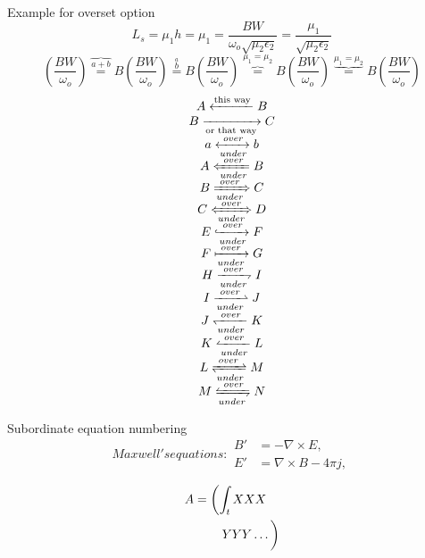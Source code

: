 \documentclass{book}
\begin{document}
Example for overset option
\begin{equation}
	L_s=\mu_1h=\mu_1=\frac{BW}{\omega_o\sqrt{\mu_2\epsilon_2}}=\frac{\mu_1}{\sqrt{\mu_2\epsilon_2}}
\end{equation}
\begin{equation}
	\left(\frac{BW}{\omega_o}\right)
	\overset{\overbrace{a+b}}{=} B
	\left(\frac{BW}{\omega_o}\right)
	\overset{\overset{a}{b}}{=} B
	\left(\frac{BW}{\omega_o}\right)
	\overset{\mu_1=\mu_2}{\overbrace{=}} B
	\left(\frac{BW}{\omega_o}\right)
	\overset{\underbrace{\mu_1=\mu_2}}{=} B
	\left(\frac{BW}{\omega_o}\right)
\end{equation}
\begin{equation}
	\begin{array}{c}
		A \xleftarrow{\text{this way}} B        \\
		B \xrightarrow[\text{or that way}]{ } C \\
		a \xleftrightarrow[under]{over} b       \\
		A \xLeftarrow[under]{over} B            \\
		B \xRightarrow[under]{over} C           \\
		C \xLeftrightarrow[under]{over} D       \\
		E \xhookrightarrow[under]{over} F       \\
		F \xmapsto[under]{over} G               \\
		H \xrightharpoondown[under]{over} I     \\[5pt]
		I \xrightharpoonup[under]{over} J       \\[5pt]
		J \xleftharpoondown[under]{over} K      \\[5pt]
		K \xleftharpoonup[under]{over} L        \\[5pt]
		L \xrightleftharpoons[under]{over} M    \\[5pt]
		M \xleftrightharpoons[under]{over} N
	\end{array}
\end{equation}

Subordinate equation numbering
\begin{subequations}
	Maxwell's equations:
	\begin{align}
		B' & =-\nabla \times E,         \\
		E' & =\nabla \times B - 4\pi j,
	\end{align}
\end{subequations}

\begin{align}
	A & =     \left(\int_t XXX       \right.\nonumber    \\
	  & \qquad \left.\vphantom{\int_t} YYY \dots \right)
\end{align}
\end{document}
